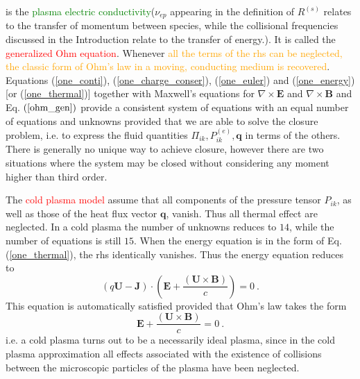 \documentclass[12pt,a4paper]{article}
\renewcommand{\vec}[1]{\boldsymbol{#1}}
\begin{document}
is the \textcolor{green}{plasma electric conductivity}($\nu_{ep}$ appearing in the definition of $R^{(s)}$ relates to the transfer of momentum between species, while the collisional frequencies discussed in the Introduction relate to the transfer of energy.). It is called the \textcolor{red}{generalized Ohm equation}. Whenever \textcolor{orange}{all the terms of the rhs can be neglected, the classic form of Ohm's law in a moving, conducting medium is recovered}. Equations (\ref{one_conti}), (\ref{one_charge_conser}), (\ref{one_euler}) and (\ref{one_energy}) [or (\ref{one_thermal})] together with Maxwell’s equations for $\nabla \times \vec{E}$ and $\nabla \times \vec{B}$ and Eq. $(\ref{ohm_gen})$ provide a consistent system of equations with an equal number of equations and unknowns provided that we are able to solve the closure problem, i.e. to express the fluid quantities $\Pi_{ik}, P^{(e)}_{ik} , \vec{q}$ in terms of the others. There is generally no unique way to achieve closure, however there are two situations where the system may be closed without considering any moment higher than third order.

The \textcolor{red}{cold plasma model} assume that all components of the pressure tensor $P_{ik}$, as well as those of the heat flux vector $\vec{q}$, vanish. Thus all thermal effect are neglected. In a cold plasma the number of unknowns reduces to $14$, while the number of equations is still $15$. When the energy equation is in the form of Eq. (\ref{one_thermal}), the rhs identically vanishes. Thus the energy equation reduces to
\begin{equation*}
(q\vec{U} -\vec{J}) \cdot \left(\vec{E} +\frac{(\vec{U}\times \vec{B})}{c} \right) = 0 ~.
\end{equation*}
This equation is automatically satisfied provided that Ohm's law takes the form
\begin{equation*}
\vec{E} +\frac{(\vec{U}\times \vec{B})}{c} = 0 ~.
\end{equation*}
i.e. a cold plasma turns out to be a necessarily ideal plasma, since in the cold plasma approximation all effects associated with the existence of collisions between the microscopic particles of the plasma have been neglected.
\end{document}

